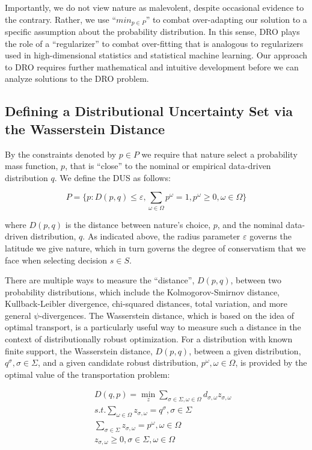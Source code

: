 Importantly, we do not view nature as malevolent, despite occasional evidence to the contrary.
Rather, we use ``$min_{p\in P}$'' to combat over-adapting our solution to a specific assumption
about the probability distribution. In this sense, DRO plays the role of a ``regularizer'' to
combat over-fitting that is analogous to regularizers used in high-dimensional statistics
and statistical machine learning. Our approach to DRO requires further mathematical and
intuitive development before we can analyze solutions to the DRO problem.

\subsection{Defining a Distributional Uncertainty Set via the Wasserstein Distance}
\label{subsec:WassersteinDistance}
By the constraints denoted by $p\in P$ we require that nature select a probability
mass function, $p$, that is ``close'' to the nominal or empirical data-driven distribution
$q$. We define the DUS as follows:

\begin{equation}
P=\{p: D(p,q)\le \varepsilon, \sum_{\omega\in \Omega} p^\omega = 1, p^\omega \ge 0, \omega \in \Omega \}
\end{equation}

where $D(p, q)$ is the distance between nature’s choice, $p$, and the nominal data-driven distribution,
$q$. As indicated above, the radius parameter $\varepsilon$ governs the latitude we give nature,
which in turn governs the degree of conservatism that we face when selecting decision $s\in S$.

There are multiple ways to measure the ``distance'', $D(p, q)$, between two probability distributions,
which include the Kolmogorov-Smirnov distance, Kullback-Leibler divergence, chi-squared distances,
total variation, and more general $\psi$-divergences. The Wasserstein distance, which is based on
the idea of optimal transport, is a particularly useful way to measure such a distance in the
context of distributionally robust optimization. For a distribution with known finite support,
the Wasserstein distance, $D(p, q)$, between a given distribution, $q^\sigma, \sigma \in \Sigma$,
and a given candidate robust distribution, $p^\omega, \omega \in \Omega$, is provided by the
optimal value of the transportation problem:

\begin{subequations}\label{WassersteinEq}
\begin{eqnarray}
& & D(q, p) = \min_{z} \sum_{\sigma \in \Sigma, \omega \in \Omega} d_{\sigma, \omega} z_{\sigma, \omega} \\
& & s.t. \sum_{\omega \in \Omega} z_{\sigma, \omega} = q^\sigma, \sigma \in \Sigma \\
& & \sum_{\sigma \in \Sigma} z_{\sigma, \omega} = p^\omega, \omega \in \Omega \\
& & z_{\sigma, \omega} \ge 0, \sigma \in \Sigma, \omega \in \Omega
\end{eqnarray}
\end{subequations}

